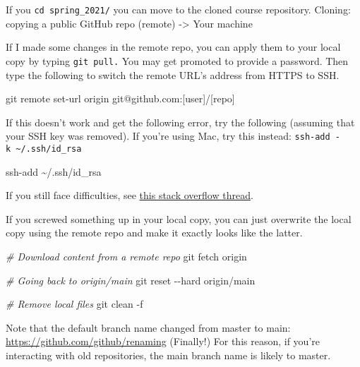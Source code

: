 \documentclass[
]{book}
\newenvironment{Shaded}{\begin{snugshade}}{\end{snugshade}}
\newcommand{\AttributeTok}[1]{\textcolor[rgb]{0.77,0.63,0.00}{#1}}
\newcommand{\CommentTok}[1]{\textcolor[rgb]{0.56,0.35,0.01}{\textit{#1}}}
\newcommand{\FunctionTok}[1]{\textcolor[rgb]{0.00,0.00,0.00}{#1}}
\newcommand{\NormalTok}[1]{#1}
\begin{document}
If you \texttt{cd\ spring\_2021/} you can move to the cloned course repository. Cloning: copying a public GitHub repo (remote) -\textgreater{} Your machine

If I made some changes in the remote repo, you can apply them to your local copy by typing \texttt{git\ pull.} You may get promoted to provide a password. Then type the following to switch the remote URL's address from HTTPS to SSH.

\begin{Shaded}
\begin{Highlighting}[]
\FunctionTok{git}\NormalTok{ remote set{-}url origin git@github.com:[user]/[repo]}
\end{Highlighting}
\end{Shaded}

If this doesn't work and get the following error, try the following (assuming that your SSH key was removed). If you're using Mac, try this instead: \texttt{ssh-add\ -k\ \textasciitilde{}/.ssh/id\_rsa}

\begin{Shaded}
\begin{Highlighting}[]
\FunctionTok{ssh{-}add}\NormalTok{ \textasciitilde{}/.ssh/id\_rsa}
\end{Highlighting}
\end{Shaded}

If you still face difficulties, see \href{https://stackoverflow.com/questions/13509293/git-fatal-could-not-read-from-remote-repository}{this stack overflow thread}.

If you screwed something up in your local copy, you can just overwrite the local copy using the remote repo and make it exactly looks like the latter.

\begin{Shaded}
\begin{Highlighting}[]
\CommentTok{\# Download content from a remote repo }
\FunctionTok{git}\NormalTok{ fetch origin}

\CommentTok{\# Going back to origin/main}
\FunctionTok{git}\NormalTok{ reset }\AttributeTok{{-}{-}hard}\NormalTok{ origin/main }

\CommentTok{\# Remove local files }
\FunctionTok{git}\NormalTok{ clean }\AttributeTok{{-}f}
\end{Highlighting}
\end{Shaded}

Note that the default branch name changed from master to main: \url{https://github.com/github/renaming} (Finally!) For this reason, if you're interacting with old repositories, the main branch name is likely to master.
\end{document}
